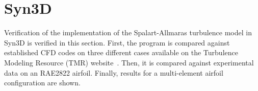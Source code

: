 \section{Syn3D}
\label{sec:resultssyn}
Verification of the implementation of the Spalart-Allmaras turbulence model in Syn3D is verified in this section. First, the program is compared against established CFD codes on three different cases available on the Turbulence Modeling Resource (TMR) website~\cite{tmr}. Then, it is compared against experimental data on an RAE2822 airfoil. Finally, results for a multi-element airfoil configuration are shown.





